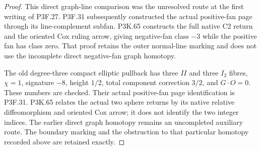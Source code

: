 \begin{proof}
This direct graph-line comparison was the unresolved route at the first writing of P3F.27. P3F.31 subsequently constructed the actual positive-fan page through its line-complement subfan. P3K.65 constructs the full native C2 return and the oriented Cox ruling arrow, giving negative-fan class \(-3\) while the positive fan has class zero. That proof retains the outer normal-line marking and does not use the incomplete direct negative-fan graph homotopy.

The old degree-three compact elliptic pullback has three \(II\) and three \(I_2\) fibres, \(\chi=1\), signature \(-8\), height \(1/2\), total component correction \(3/2\), and \(G\cdot O=0\). These numbers are checked. Their actual positive-fan page identification is P3F.31. P3K.65 relates the actual two sphere returns by its native relative diffeomorphism and oriented Cox arrow; it does not identify the two integer indices. The earlier direct graph homotopy remains an uncompleted auxiliary route. The boundary marking and the obstruction to that particular homotopy recorded above are retained exactly.
\end{proof}
